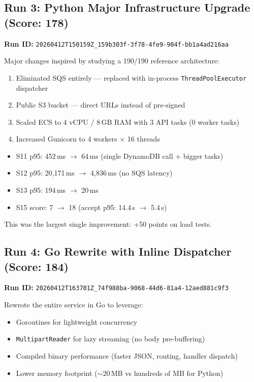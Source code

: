 \documentclass[11pt]{article}
\begin{document}
\subsection{Run 3: Python Major Infrastructure Upgrade (Score: 178)}

\textbf{Run ID:} \texttt{20260412T150159Z\_159b303f-3f78-4fe9-904f-bb1a4ad216aa}

Major changes inspired by studying a 190/190 reference architecture:
\begin{enumerate}
    \item Eliminated SQS entirely --- replaced with in-process \texttt{ThreadPoolExecutor} dispatcher
    \item Public S3 bucket --- direct URLs instead of pre-signed
    \item Scaled ECS to 4 vCPU / 8\,GB RAM with 3 API tasks (0 worker tasks)
    \item Increased Gunicorn to 4 workers $\times$ 16 threads
\end{enumerate}

\begin{itemize}
    \item S11 p95: 452\,ms $\rightarrow$ 64\,ms (single DynamoDB call + bigger tasks)
    \item S12 p95: 20,171\,ms $\rightarrow$ 4,836\,ms (no SQS latency)
    \item S13 p95: 194\,ms $\rightarrow$ 20\,ms
    \item S15 score: 7 $\rightarrow$ 18 (accept p95: 14.4\,s $\rightarrow$ 5.4\,s)
\end{itemize}

This was the largest single improvement: +50 points on load tests.

\subsection{Run 4: Go Rewrite with Inline Dispatcher (Score: 184)}

\textbf{Run ID:} \texttt{20260412T163701Z\_74f988ba-9068-44d6-81a4-12aed881c9f3}

Rewrote the entire service in Go to leverage:
\begin{itemize}
    \item Goroutines for lightweight concurrency
    \item \texttt{MultipartReader} for lazy streaming (no body pre-buffering)
    \item Compiled binary performance (faster JSON, routing, handler dispatch)
    \item Lower memory footprint ($\sim$20\,MB vs hundreds of MB for Python)
\end{itemize}
\end{document}
